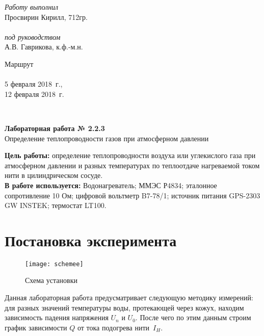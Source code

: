 \documentclass[a4paper,12pt]{article} %
\newcommand{\RomanNumeralCaps}[1]
{\MakeUppercase{\romannumeral #1}}
\begin{document}
	
	
\begin{minipage}[l]{0.3\textwidth}
	\textit{Работу выполнил}\\
	Просвирин Кирилл, 712гр.\\\\
	\textit{под руководством}\\
	А.В. Гаврикова, к.ф.-м.н.
\end{minipage}
\hfill
\begin{minipage}[l]{0.2\textwidth}
	Маршрут \RomanNumeralCaps{9} \\\\
	5 февраля 2018~г.,\\
	12 февраля 2018~г.\\
\end{minipage}
\\[20pt]
\begin{center}
	\LARGE{\textbf{Лабораторная работа № 2.2.3}\\
		Определение теплопроводности газов при атмосферном давлении \\[20pt]}
\end{center}

\textbf{Цель работы: }определение теплопроводности воздуха или 
углекислого газа при атмосферном давлении и разных температурах по 
теплоотдаче нагреваемой током нити в цилиндрическом сосуде.\\

\textbf{В работе используется: }Водонагреватель; ММЭС Р4834; эталонное сопротивление 10 Ом; цифровой вольтметр B7-78/1; источник питания GPS-2303 GW INSTEK; 
термостат LT100.


\section{Постановка эксперимента}
\begin{wrapfigure}{r}{0.5\textwidth}\centering
	\texttt{[image: schemee]}
	\caption{Схема установки}
\end{wrapfigure}
Данная лабораторная работа предусматривает следующую методику измерений:
для разных значений температуры воды, протекающей через кожух, находим
зависимость падения напряжения $ U_n $ и $ U_0 $. После чего по этим
данным строим график зависимости $ Q $ от тока подогрева нити~$ I_H $.\\
\end{document}
